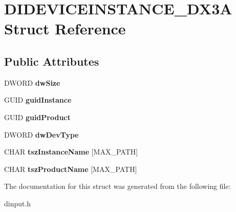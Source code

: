 \hypertarget{struct_d_i_d_e_v_i_c_e_i_n_s_t_a_n_c_e___d_x3_a}{\section{D\-I\-D\-E\-V\-I\-C\-E\-I\-N\-S\-T\-A\-N\-C\-E\-\_\-\-D\-X3\-A Struct Reference}
\label{struct_d_i_d_e_v_i_c_e_i_n_s_t_a_n_c_e___d_x3_a}
}
\subsection*{Public Attributes}
\begin{DoxyCompactItemize}
\item 
\hypertarget{struct_d_i_d_e_v_i_c_e_i_n_s_t_a_n_c_e___d_x3_a_ac55458514c69aec0053dcd07ee93d29c}{D\-W\-O\-R\-D {\bfseries dw\-Size}}\label{struct_d_i_d_e_v_i_c_e_i_n_s_t_a_n_c_e___d_x3_a_ac55458514c69aec0053dcd07ee93d29c}

\item 
\hypertarget{struct_d_i_d_e_v_i_c_e_i_n_s_t_a_n_c_e___d_x3_a_aea3ebfdfa1f3646b4e5ab56bf6de65bf}{G\-U\-I\-D {\bfseries guid\-Instance}}\label{struct_d_i_d_e_v_i_c_e_i_n_s_t_a_n_c_e___d_x3_a_aea3ebfdfa1f3646b4e5ab56bf6de65bf}

\item 
\hypertarget{struct_d_i_d_e_v_i_c_e_i_n_s_t_a_n_c_e___d_x3_a_a215a2b09c2c5577ee48d575b0fe56614}{G\-U\-I\-D {\bfseries guid\-Product}}\label{struct_d_i_d_e_v_i_c_e_i_n_s_t_a_n_c_e___d_x3_a_a215a2b09c2c5577ee48d575b0fe56614}

\item 
\hypertarget{struct_d_i_d_e_v_i_c_e_i_n_s_t_a_n_c_e___d_x3_a_afb93f1f08151e3227308e4e97d6b2cdb}{D\-W\-O\-R\-D {\bfseries dw\-Dev\-Type}}\label{struct_d_i_d_e_v_i_c_e_i_n_s_t_a_n_c_e___d_x3_a_afb93f1f08151e3227308e4e97d6b2cdb}

\item 
\hypertarget{struct_d_i_d_e_v_i_c_e_i_n_s_t_a_n_c_e___d_x3_a_a23bb703ff01cefa3e79d7ed59bf877b9}{C\-H\-A\-R {\bfseries tsz\-Instance\-Name} \mbox{[}M\-A\-X\-\_\-\-P\-A\-T\-H\mbox{]}}\label{struct_d_i_d_e_v_i_c_e_i_n_s_t_a_n_c_e___d_x3_a_a23bb703ff01cefa3e79d7ed59bf877b9}

\item 
\hypertarget{struct_d_i_d_e_v_i_c_e_i_n_s_t_a_n_c_e___d_x3_a_af4930830a47ee30c5cbcf7cbac2f700d}{C\-H\-A\-R {\bfseries tsz\-Product\-Name} \mbox{[}M\-A\-X\-\_\-\-P\-A\-T\-H\mbox{]}}\label{struct_d_i_d_e_v_i_c_e_i_n_s_t_a_n_c_e___d_x3_a_af4930830a47ee30c5cbcf7cbac2f700d}

\end{DoxyCompactItemize}


The documentation for this struct was generated from the following file\-:\begin{DoxyCompactItemize}
\item 
dinput.\-h\end{DoxyCompactItemize}

